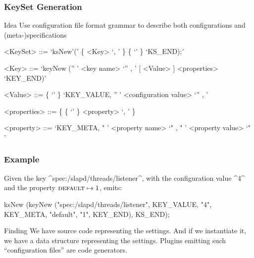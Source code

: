 \begin{frame}[fragile]
	\frametitle{KeySet Generation}
	\begin{alertblock}{Idea}
	Use configuration file format grammar to describe both configurations and (meta-)specifications
	\end{alertblock}
	\pause

	\begin{grammar}
	<KeySet> ::= \lq ksNew'\WhiteSpace(' \{ <Key> \lq , \LineBreak'  \}  \{ \lq\WhiteSpace' \} \lq KS\_END);'

	<Key> ::= \lq keyNew \WhiteSpace ('' ' <key name> \lq ''  , \LineBreak' [ <Value> ] <properties> \lq KEY_END)'

	<Value> ::=  \{ \lq\WhiteSpace' \} \lq KEY\_VALUE, \WhiteSpace '' ' <configuration value> \lq ''  , \LineBreak'

	<properties> ::= \{ \{ \lq\WhiteSpace' \} <property> \lq , \LineBreak' \}

	<property> ::=  \lq KEY\_META, \WhiteSpace " ' <property name> \lq "  , \WhiteSpace " ' <property value> \lq " '
	\end{grammar}
\end{frame}

\begin{frame}[fragile]
	\frametitle{Example}
	\begin{example}
	Given the key ^spec:/slapd/threads/listener^, with the configuration value ^4^ and the property ${\textsc{default}} \mapsto 1$, \elektra{} emits:

	\begin{code}[gobble=4,language=Cpp]
	ksNew (keyNew ("spec:/slapd/threads/listener",
		       KEY_VALUE, "4",
		       KEY_META, "default", "1",
		       KEY_END),
	       KS_END);
	\end{code}
	\vspace{-1em}
	\end{example}

	\pause
	\begin{alertblock}{Finding}
	We have source code representing the settings.
	And if we instantiate it, we have a data structure representing the settings.
	Plugins emitting such ``configuration files'' are code generators.
	\end{alertblock}
\end{frame}


